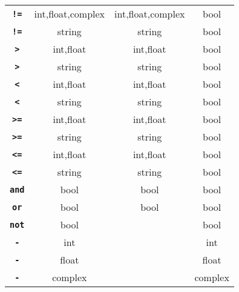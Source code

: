 \begin{center}
\begin{tabular}{c|c|c|c}
\texttt{\textbf{!=}} & int,float,complex   & int,float,complex     & bool\\
\texttt{\textbf{!=}} & string   & string     & bool\\
\texttt{\textbf{>}} & int,float   & int,float     & bool\\
\texttt{\textbf{>}} & string   & string     & bool\\
\texttt{\textbf{<}} & int,float   & int,float     & bool\\
\texttt{\textbf{<}} & string   & string     & bool\\
\texttt{\textbf{>=}} & int,float   & int,float     & bool\\
\texttt{\textbf{>=}} & string   & string     & bool\\
\texttt{\textbf{<=}}    & int,float   & int,float     & bool\\
\texttt{\textbf{<=}} & string   & string     & bool\\
\texttt{\textbf{and}} & bool & bool & bool\\
\texttt{\textbf{or}}   & bool & bool & bool\\
\texttt{\textbf{not}}    & bool &      & bool\\
\texttt{\textbf{-}}    & int &    & int\\
\texttt{\textbf{-}}    & float &    & float\\
\texttt{\textbf{-}}    & complex &    & complex

\end{tabular}
\end{center}

